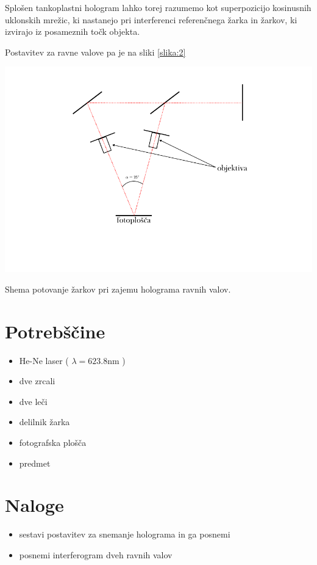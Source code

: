 \documentclass[11pt]{article}
\renewcommand{%
  \refname}{Viri}
\begin{document}
Splošen tankoplastni hologram lahko torej razumemo kot superpozicijo kosinusnih uklonskih mrežic, ki nastanejo pri interferenci referenčnega žarka in žarkov, ki izvirajo iz posameznih točk objekta.

Postavitev za ravne valove pa je na sliki \ref{slika:2}
\begin{slika}[H]
\begin{center}
\includegraphics[width=1.25\linewidth]{ravni_zarek.pdf}
\end{center}
\caption{\small Shema potovanje žarkov pri zajemu holograma ravnih valov.}\label{slika:2}
\end{slika}

\section{Potrebščine}\label{sec:orgc1ffef0}

\begin{itemize}
\item He-Ne laser ( \(\lambda = 623.8 \mathrm{nm}\) )
\item dve zrcali
\item dve leči
\item delilnik žarka
\item fotografska plošča
\item predmet
\end{itemize}
\section{Naloge}\label{sec:org93ee1e7}
\begin{itemize}
\item sestavi postavitev za snemanje holograma in ga posnemi
\item posnemi interferogram dveh ravnih valov
\end{itemize}
\end{document}
